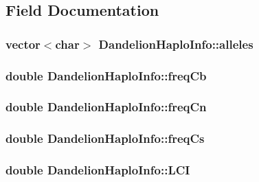 \subsection{Field Documentation}
\hypertarget{structDandelionHaploInfo_af54d760696f9e4e7f3acaba503b6558c}{
\subsubsection[{alleles}]{\setlength{\rightskip}{0pt plus 5cm}vector$<$char$>$ {\bf DandelionHaploInfo::alleles}}}
\label{structDandelionHaploInfo_af54d760696f9e4e7f3acaba503b6558c}
\hypertarget{structDandelionHaploInfo_aa2d64bf0ece7cb0b33e97e3ef12a21e3}{
\subsubsection[{freqCb}]{\setlength{\rightskip}{0pt plus 5cm}double {\bf DandelionHaploInfo::freqCb}}}
\label{structDandelionHaploInfo_aa2d64bf0ece7cb0b33e97e3ef12a21e3}
\hypertarget{structDandelionHaploInfo_aa3f299599bd3849b31a4e3490a0babbb}{
\subsubsection[{freqCn}]{\setlength{\rightskip}{0pt plus 5cm}double {\bf DandelionHaploInfo::freqCn}}}
\label{structDandelionHaploInfo_aa3f299599bd3849b31a4e3490a0babbb}
\hypertarget{structDandelionHaploInfo_a015f6e666bc1e405cd536576269d13b8}{
\subsubsection[{freqCs}]{\setlength{\rightskip}{0pt plus 5cm}double {\bf DandelionHaploInfo::freqCs}}}
\label{structDandelionHaploInfo_a015f6e666bc1e405cd536576269d13b8}
\hypertarget{structDandelionHaploInfo_a816709cc46ab54a0a6afe7e5e48d9a22}{
\subsubsection[{LCI}]{\setlength{\rightskip}{0pt plus 5cm}double {\bf DandelionHaploInfo::LCI}}}
